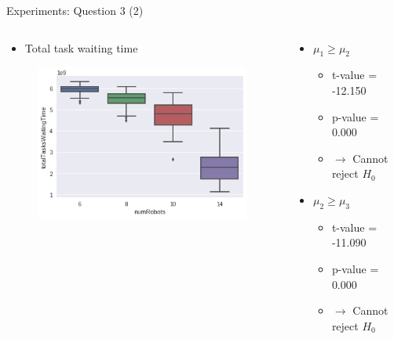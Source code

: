 \begin{frame}{Experiments: Question 3 (2)}
    \begin{columns}

        \begin{column}{0.5\textwidth}
            \begin{itemize}
                \item Total task waiting time
            \end{itemize}

            \begin{figure}[hbt]
                \includegraphics[width=1.1\textwidth]{img/question3-plot1}
            \end{figure}
        \end{column}

        \begin{column}{0.5\textwidth}
            \begin{itemize}
                \item $\mu_1 \geq \mu_2$
                    \begin{itemize}
                        \item t-value = -12.150
                        \item p-value = 0.000
                        \item $\rightarrow$ Cannot reject $H_0$
                    \end{itemize}

                \item $\mu_2 \geq \mu_3$
                    \begin{itemize}
                        \item t-value = -11.090
                        \item p-value = 0.000
                        \item $\rightarrow$ Cannot reject $H_0$
                    \end{itemize}


\end{itemize}
\end{column}
\end{columns}
\end{frame}
